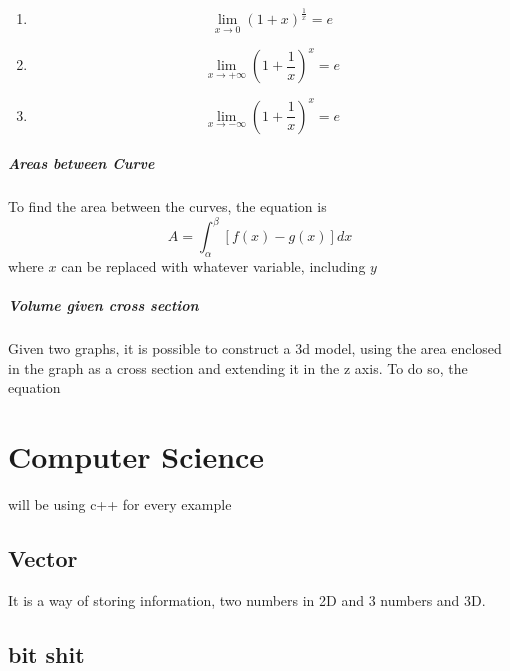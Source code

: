 \documentclass{article} %
\theoremstyle{theorem}
\theoremstyle{definition}
\newtheorem{definition}{Definition}
\begin{document}
                    \begin{enumerate}[label=(\alph*)]
                        \item \begin{equation} \lim_{x\rightarrow0}(1+x)^{\frac{1}{x}}=e \end{equation}
                        \item \begin{equation} \lim_{x\rightarrow +\infty}(1+\frac{1}{x})^x=e \end{equation}
                        \item \begin{equation} \lim_{x\rightarrow -\infty}(1+\frac{1}{x})^x=e \end{equation}
                    \end{enumerate}
                \subparagraph{Areas between Curve}
                    To find the area between the curves, the equation is \begin{equation}
                        A=\int_{\alpha}^{\beta}[f(x)-g(x)]dx
                        \label{eq:AreaBtCurve}
                    \end{equation}
                    where $x$ can be replaced with whatever variable, including $y$
                \subparagraph{Volume given cross section}
                    Given two graphs, it is possible to construct a 3d model, using the area enclosed in the graph as a cross section and extending it in the z axis. To do so, the equation %
\pagebreak
\section{Computer Science}\label{sec:csSec}
will be using c++ for every example
    \subsection{Vector}\label{sub:csVec}
    It is a way of storing information, two numbers in 2D and 3 numbers and 3D.
    \subsection{bit shit}
\end{document}
